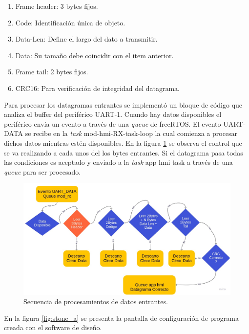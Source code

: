 \begin{enumerate}

\item Frame header: 3 bytes fijos.
\item Code: Identificación única de objeto.
\item Data-Len: Define el largo del dato a transmitir.
\item Data: Su tamaño debe coincidir con el item anterior.
\item Frame tail: 2 bytes fijos.
\item CRC16: Para verificación de integridad del datagrama.

\end{enumerate}

Para procesar los datagramas entrantes se implementó un bloque de código que analiza el buffer del periférico UART-1. Cuando hay datos disponibles el periférico envía un evento a través de una \textit{queue} de freeRTOS. El evento UART-DATA se recibe en la \textit{task} mod-hmi-RX-task-loop la cual comienza a procesar dichos datos mientras estén disponibles. En la figura \ref{fig:secuencia_a} se observa el control que se va realizando a cada unos del los bytes entrantes. Si el datagrama pasa todas las condiciones es aceptado y enviado a la \textit{task} app hmi task a través de una \textit{queue} para ser procesado.


\begin{figure}[h!]
	\centering
	\includegraphics[width=\textwidth]{./Figures/Secuencia_lectura_uart.jpg}
	\caption{Secuencia de procesamientos de datos entrantes.}
	\label{fig:secuencia_a}
\end{figure}

 
En la figura \ref{fig:stone_a} se presenta la pantalla de configuración de programa creada con el software de diseño. 

